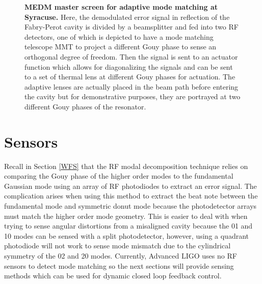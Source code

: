 	\begin{figure}[h]
		\centering
		\caption[MEDM master screen for adaptive mode matching at Syracuse.]
		{\textbf{MEDM master screen for adaptive mode matching at Syracuse.}  
			Here, the demodulated error signal in reflection of the Fabry-Perot cavity is divided by a beamsplitter and fed into two RF detectors, one of which is depicted to have a mode matching telescope MMT to project a different Gouy phase to sense an orthogonal degree of freedom. Then the signal is sent to an actuator function which allows for diagonalizing the signals and can be sent to a set of thermal lens at different Gouy phases for actuation.  The adaptive lenses are actually placed in the beam path before entering the cavity but for demonstrative purposes, they are portrayed at two different Gouy phases of the resonator.
		}
		\label{fig:AMM_Master}
	\end{figure}

	\section{Sensors}
	Recall in Section \ref{WFS} that the RF modal decomposition technique relies on comparing the Gouy phase of the higher order modes to the fundamental Gaussian mode using an array of RF photodiodes to extract an error signal. The complication arises when using this method to extract the beat note between the fundamental mode and symmetric donut mode because the photodetector arrays must match the higher order mode geometry.  This is easier to deal with when trying to sense angular distortions from a misaligned cavity because the 01 and 10 modes can be sensed with a split photodetector, however, using a quadrant photodiode will not work to sense mode mismatch due to the cylindrical symmetry of the 02 and 20 modes. Currently, Advanced LIGO uses no RF sensors to detect mode matching so the next sections will provide sensing methods which can be used for dynamic closed loop feedback control.
	
